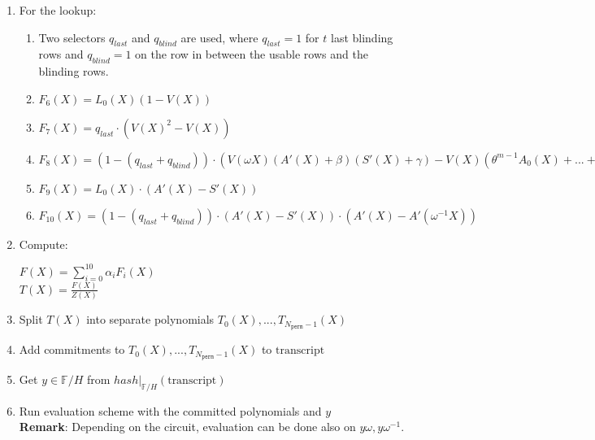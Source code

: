 \begin{enumerate}
\begin{center}
            $F_1(X) = L_1(X)(Q(X) - 1)$ \\
            $F_2(X) = P(X)p'(X) - P(X\omega)$ \\
            $F_3(X) = Q(X)q'(X) - Q(X\omega)$ \\
            $F_4(X) = L_n(X)(P(X\omega) - Q(X\omega))$ \\
            $F_5(X) = \sum\limits_{0 \leq i < N_{\texttt{sel}}} (\tau^i \cdot \textbf{q}_{i}(X) \cdot \texttt{gate}_i(X))
            + PI(X)$
        \end{center}
    \item For the lookup:
        \begin{enumerate}
            \item Two selectors $q_{last}$ and $q_{blind}$ are used, where $q_{last} = 1$ for $t$ last blinding rows and $q_{blind} = 1$ on the row in between the usable rows and the blinding rows.
            \item $F_6(X) = L_0(X) (1 - V(X))$
            \item $F_7(X) = q_{last} \cdot (V(X)^2 - V(X))$
            \item $F_8(X) = (1 - (q_{last} + q_{blind})) \cdot ( V(\omega X) (A'(X) + \beta) (S'(X) + \gamma) - V(X) (\theta^{m-1} A_0(X) + ... + A_{m-1}(X) + \beta) (\theta^{m-1} S_0(X) + ... + S_{m-1}(X) + \gamma) )$
            \item $F_9(X) = L_0(X) \cdot (A'(X) - S'(X))$
            \item $F_{10}(X) = (1 - (q_{last} + q_{blind})) \cdot (A'(X) - S'(X))\cdot(A'(X) - A'(\omega^{-1} X))$
        \end{enumerate}
    \item Compute:
        \begin{center}
            $F(X) = \sum\limits_{i = 0}^{10} \alpha_iF_i(X)$ \\
            $T(X) = \frac{F(X)}{Z(X)}$
        \end{center}
    \item Split $T(X)$ into separate polynomials $T_0(X), ..., T_{N_{\texttt{perm}} - 1}(X)$
    \item Add commitments to $T_0(X), ..., T_{N_{\texttt{perm}} - 1}(X)$ to $\text{transcript}$
    \item Get $y \in \mathbb{F}/H$ from $hash|_{\mathbb{F}/H}(\text{transcript})$
    \item Run evaluation scheme with the committed polynomials and $y$ \\
        \textbf{Remark}: Depending on the circuit, evaluation can be done also on $y\omega, y\omega^{-1}$.

\end{enumerate}
